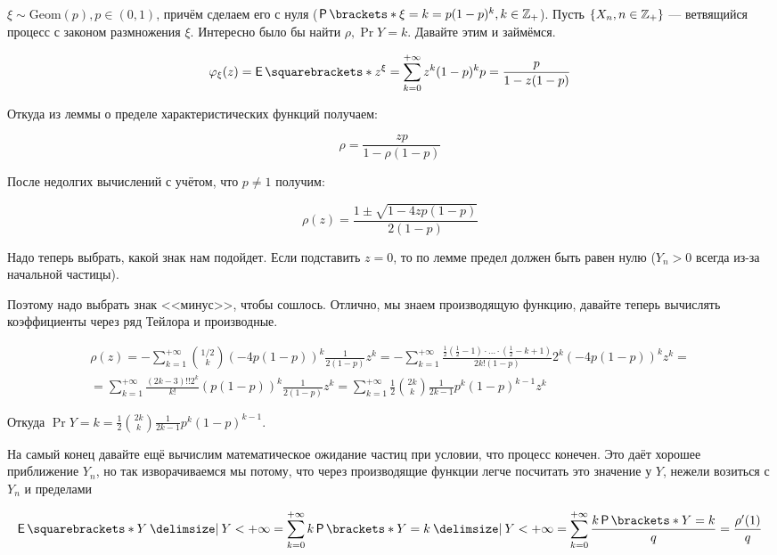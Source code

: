 \begin{example}
  $\xi \sim \mathrm{Geom}(p), p \in (0, 1)$, причём сделаем его с нуля ($\Pr{\xi = k} =
  p(1 - p)^k, k \in \Z_+$). Пусть $\{X_n, n \in \mathbb{Z}_+\}$ --- ветвящийся процесс
  с законом размножения $\xi$. Интересно было бы найти $\rho, \Pr{Y = k}$. Давайте
  этим и займёмся.

  \[
    \phi_{\xi}(z) = \E{z^\xi} = \sum\limits_{k = 0}^{+\infty} z^k(1-p)^kp = 
    \frac{p}{1 - z(1 - p)}
  \]

  Откуда из леммы о пределе характеристических функций получаем:

  \[
    \rho = \frac{zp}{1 - \rho(1 - p)}
  \]

  После недолгих вычислений с учётом, что $p \neq 1$ получим:

  \[
    \rho(z) = \frac{1 \pm \sqrt{1 - 4zp(1 - p)}}{2(1 - p)}
  \]

  Надо теперь выбрать, какой знак нам подойдет. Если подставить $z = 0$, то
  по лемме предел должен быть равен нулю ($Y_n > 0$ всегда из-за начальной частицы).

  Поэтому надо выбрать знак <<минус>>, чтобы сошлось. Отлично, мы знаем производящую
  функцию, давайте теперь вычислять коэффициенты через ряд Тейлора и производные.

  \begin{multline}
    \rho(z) = -\sum\limits_{k = 1}^{+\infty} \binom{1/2}{k}(-4 p(1 - p))^k \frac{1}{2(1 - p)}z^k =
    -\sum\limits_{k = 1}^{+\infty}\frac{\frac12\left(\frac{1}{2} - 
    1\right)\cdot\ldots\cdot(\frac{1}{2} - k + 1)}{2k!(1 - p)}2^k (-4p(1 - p))^k z^k =\\=
    \sum\limits_{k = 1}^{+\infty}\frac{(2k - 3)!!2^k}{k!}(p(1 - p))^k \frac{1}{2(1 - p)} z^k =
    \sum\limits_{k = 1}^{+\infty}\frac12 \binom{2k}{k} \frac{1}{2k - 1} p^k(1 - p)^{k - 1} z^k
  \end{multline}

  Откуда $\Pr{Y = k} =\frac12 \binom{2k}{k} \frac{1}{2k - 1} p^k(1 - p)^{k - 1}$.

\end{example}

На самый конец давайте ещё вычислим математическое ожидание частиц при условии, 
что процесс конечен. Это даёт хорошее приближение $Y_n$, но так изворачиваемся
мы потому, что через производящие функции легче посчитать это значение у $Y$,
нежели возиться с $Y_n$ и пределами

\[
  \E{Y \given Y < +\infty} = \sum\limits_{k = 0}^{+\infty} k \Pr{Y = k \given Y < +\infty} =
  \sum\limits_{k = 0}^{+\infty} \frac{k \Pr{Y = k}}{q} = 
  \frac{\rho'(1)}{q}
\]

